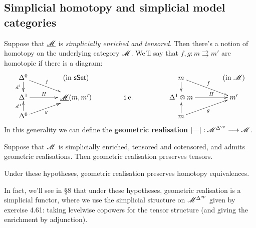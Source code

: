 \documentclass[11pt]{article}
\begin{document}
\begin{4. Basic concepts in enriched category theory}
\subsection*{Simplicial homotopy and simplicial model categories}
Suppose that $\underline{\mathscr{M}}$ is \textit{simplicially enriched and tensored}. Then there's a notion of homotopy on the underlying category $\mathscr{M}$. We'll say that $f,g:m\rightrightarrows m'$ are homotopic if there is a diagram:
\[\xymatrix@!C@R=4mm{
\Delta^0
\ar[dr]^-{f}
\ar[d]_-{d^1}
&%
\textup{(in $\sSet$)}&%
&%
m
\ar[dr]^-{f}
\ar[d]
&%
\textup{(in $\scrm$)}
\\%
\Delta^1
\ar[r]^-{H}
&%
\underline{\scrm}(m,m')
&%
\textup{i.e.}&%
\Delta^1\otimes m
\ar[r]^-{H}
&%
m'\\%
\Delta^0
\ar[u]^-{d^0}
\ar[ur]_-{g}
&%
&%
&%
m
\ar[u]
\ar[ur]_-{g}
&%
}\]
In this generality we can define the \textbf{geometric realisation} $|\textup{---} |:\mathscr{M}^{\Delta^{\textup{op}}}\longrightarrow\mathscr{M}$.
\begin{lem*}[4.66]
Suppose that $\mathscr{M}$ is simplicially enriched, tensored and cotensored, and admits geometric realisations. Then geometric realisation preserves tensors.
\end{lem*}
\begin{cor*}
Under these hypotheses, geometric realisation preserves homotopy equivalences.
\end{cor*}
In fact, we'll see in \S8 that under these hypotheses, geometric realisation is a simplicial functor, where we  use the simplicial structure on $\mathscr{M}^{\Delta^{\textup{op}}}$ given by exercise 4.61: taking levelwise copowers for the tensor structure (and giving the enrichment by adjunction).
\end{4. Basic concepts in enriched category theory}
\end{document}
